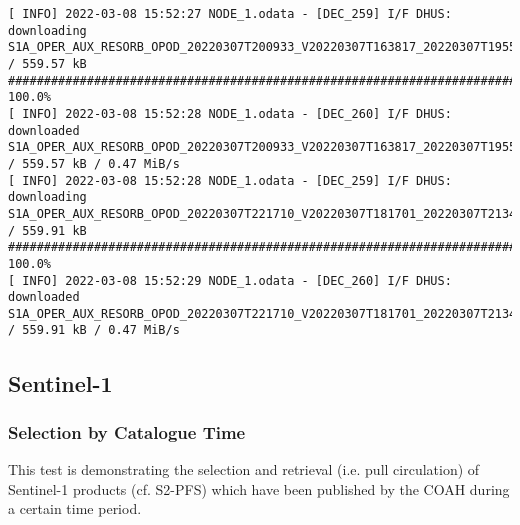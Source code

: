 \documentclass[dec_sum_main.tex]{subfiles}
\begin{document}
\begin{Verbatim}[fontsize=\tiny]
[ INFO] 2022-03-08 15:52:27 NODE_1.odata - [DEC_259] I/F DHUS: downloading S1A_OPER_AUX_RESORB_OPOD_20220307T200933_V20220307T163817_20220307T195547 / 559.57 kB
########################################################################################################################################################################################################## 100.0%
[ INFO] 2022-03-08 15:52:28 NODE_1.odata - [DEC_260] I/F DHUS: downloaded S1A_OPER_AUX_RESORB_OPOD_20220307T200933_V20220307T163817_20220307T195547 / 559.57 kB / 0.47 MiB/s
[ INFO] 2022-03-08 15:52:28 NODE_1.odata - [DEC_259] I/F DHUS: downloading S1A_OPER_AUX_RESORB_OPOD_20220307T221710_V20220307T181701_20220307T213431 / 559.91 kB
########################################################################################################################################################################################################## 100.0%
[ INFO] 2022-03-08 15:52:29 NODE_1.odata - [DEC_260] I/F DHUS: downloaded S1A_OPER_AUX_RESORB_OPOD_20220307T221710_V20220307T181701_20220307T213431 / 559.91 kB / 0.47 MiB/s
\end{Verbatim}

\subsection{Sentinel-1}

\subsubsection{Selection by Catalogue Time}
This test is demonstrating the selection and retrieval (i.e. pull circulation) of Sentinel-1 products (cf. S2-PFS) which have been published by the COAH during a certain time period. \newline

 \newline
\end{document}
